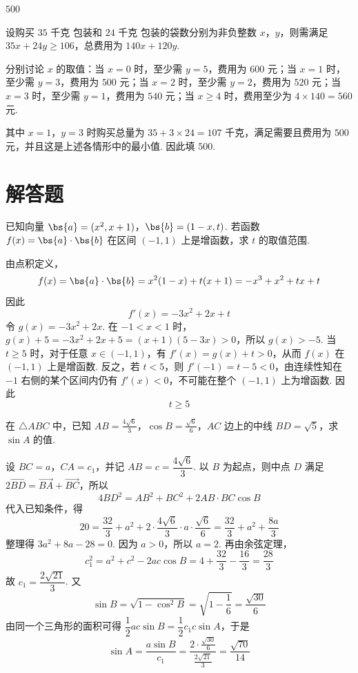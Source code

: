 \begin{answer}
\(500\)
\end{answer}

\begin{solution}
设购买 \(35\text{ 千克}\) 包装和 \(24\text{ 千克}\) 包装的袋数分别为非负整数 \(x\)，\(y\)，则需满足 \(35x+24y\geqslant106\)，总费用为 \(140x+120y\).

分别讨论 \(x\) 的取值：当 \(x=0\) 时，至少需 \(y=5\)，费用为 \(600\) 元；当 \(x=1\) 时，至少需 \(y=3\)，费用为 \(500\) 元；当 \(x=2\) 时，至少需 \(y=2\)，费用为 \(520\) 元；当 \(x=3\) 时，至少需 \(y=1\)，费用为 \(540\) 元；当 \(x\geqslant4\) 时，费用至少为 \(4\times140=560\) 元.

其中 \(x=1\)，\(y=3\) 时购买总量为 \(35+3\times24=107\text{ 千克}\)，满足需要且费用为 \(500\) 元，并且这是上述各情形中的最小值. 因此填 \(500\).
\end{solution}

\section{解答题}
\begin{problem}
已知向量 \(\bs{a} = (x^2, x + 1)\)，\(\bs{b} = (1 - x, t)\). 若函数 \(f(x) = \bs{a} \cdot \bs{b}\) 在区间 \((-1, 1)\) 上是增函数，求 \(t\) 的取值范围.
\end{problem}

\begin{solution}
由点积定义，
\[
f(x)=\bs{a}\cdot\bs{b}=x^{2}(1-x)+t(x+1)=-x^{3}+x^{2}+tx+t
\]
因此
\[
f'(x)=-3x^{2}+2x+t
\]
令 \(g(x)=-3x^{2}+2x\). 在 \(-1<x<1\) 时，\(g(x)+5=-3x^{2}+2x+5=(x+1)(5-3x)>0\)，所以 \(g(x)>-5\). 当 \(t\geqslant5\) 时，对于任意 \(x\in(-1,1)\)，有 \(f'(x)=g(x)+t>0\)，从而 \(f(x)\) 在 \((-1,1)\) 上是增函数. 反之，若 \(t<5\)，则 \(f'(-1)=t-5<0\)，由连续性知在 \(-1\) 右侧的某个区间内仍有 \(f'(x)<0\)，不可能在整个 \((-1,1)\) 上为增函数. 因此
\[
t\geqslant5
\]
\end{solution}

\begin{problem}
在 \(\triangle ABC\) 中，已知 \(AB = \frac{4\sqrt{6}}{3}\)，\(\cos B = \frac{\sqrt{6}}{6}\)，\(AC\) 边上的中线 \(BD = \sqrt{5}\)，求 \(\sin A\) 的值.
\end{problem}

\begin{solution}
设 \(BC=a\)，\(CA=c_1\)，并记 \(AB=c=\dfrac{4\sqrt{6}}{3}\). 以 \(B\) 为起点，则中点 \(D\) 满足 \(2\overrightarrow{BD}=\overrightarrow{BA}+\overrightarrow{BC}\)，所以
\[
4BD^{2}=AB^{2}+BC^{2}+2AB\cdot BC\cos B
\]
代入已知条件，得
\[
20=\frac{32}{3}+a^{2}+2\cdot\frac{4\sqrt{6}}{3}\cdot a\cdot\frac{\sqrt{6}}{6}=\frac{32}{3}+a^{2}+\frac{8a}{3}
\]
整理得 \(3a^{2}+8a-28=0\). 因为 \(a>0\)，所以 \(a=2\). 再由余弦定理，
\[
c_1^{2}=a^{2}+c^{2}-2ac\cos B=4+\frac{32}{3}-\frac{16}{3}=\frac{28}{3}
\]
故 \(c_1=\dfrac{2\sqrt{21}}{3}\). 又
\[
\sin B=\sqrt{1-\cos^{2}B}=\sqrt{1-\frac{1}{6}}=\frac{\sqrt{30}}{6}
\]
由同一个三角形的面积可得 \(\dfrac12 ac\sin B=\dfrac12 c_1c\sin A\)，于是
\[
\sin A=\frac{a\sin B}{c_1}=\frac{2\cdot\frac{\sqrt{30}}{6}}{\frac{2\sqrt{21}}{3}}=\frac{\sqrt{70}}{14}
\]
\end{solution}

